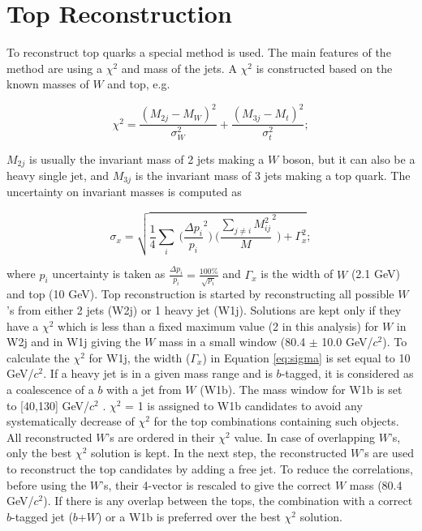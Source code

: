\section{Top Reconstruction}
\label{sect:top}
To reconstruct top quarks a special method is used.  
The main features 
of the method are using a $\chi^2$ and mass of the jets. A $\chi^2$ is
constructed based on the known masses of $W$ and top, e.g.
\begin{linenomath}
\begin{equation}
\label{eq:chi2}
\chi^2 = \frac{(M_{2j} - M_W)^2}{\sigma^2_W} + \frac{(M_{3j} - M_t)^2}{\sigma^2_t}; 
\end{equation}
\end{linenomath}
$M_{2j}$ is usually the invariant mass of 2 jets making a $W$ boson, 
but it can also be a heavy single jet, and $M_{3j}$ is the invariant mass of 3 jets making a top quark. The uncertainty on invariant masses is computed as
\begin{linenomath}
\begin{equation}
\label{eq:sigma}
\sigma_x = \sqrt{\frac{1}{4}\sum_{i} \pod{\frac{\Delta p_i}{p_i}}^2\pod{\frac{\sum_{j \neq i} M_{ij}^2}{M}}^2 + \Gamma_x^2}; 
\end{equation}
\end{linenomath}
where $p_i$ uncertainty is taken as $\frac{\Delta p_i}{p_i} = \frac{100\%}{\sqrt{p_i}}$ and $\Gamma_x$ is the width of $W$ (2.1 GeV) 
and top (10 GeV). Top reconstruction is started by reconstructing all possible $W$'s from either 2 jets (W2j) or 1 heavy jet (W1j).
Solutions are kept only if they have a $\chi^2$ which is less than a fixed maximum value (2 in this analysis) for $W$ in W2j
and in W1j giving the $W$ mass in a small window (80.4 $\pm$ 10.0 GeV/$c^2$). To calculate the $\chi^2$ for W1j, the width ($\Gamma_x$) in 
Equation \ref{eq:sigma} is set equal to 10 GeV/$c^2$. If a heavy jet is in a given mass range and is $b$-tagged, 
it is considered as a coalescence of a $b$ with a jet from $W$ (W1b). The mass window for W1b is set to [40,130] GeV/$c^2$ . 
$\chi^2$ = 1 is assigned to W1b candidates to avoid any systematically decrease of $\chi^2$ for the top combinations containing such objects.
All reconstructed $W$'s are ordered in their $\chi^2$ value. In case of overlapping $W$'s, only the best $\chi^2$ solution is kept. 
In the next step, the reconstructed $W$'s are used to reconstruct the top candidates by adding a free jet. To reduce the correlations,
before using the $W$'s, their 4-vector is rescaled to give the correct $W$ mass (80.4 GeV/$c^2$). If there is any overlap between the tops, 
the combination with a correct $b$-tagged jet ($b$+$W$) or a W1b is preferred over the best $\chi^2$ solution. 

